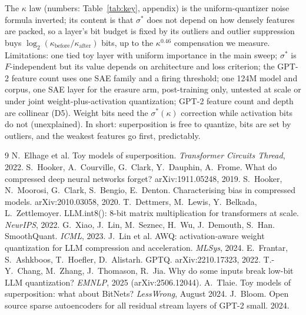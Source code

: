\documentclass{article}
\begin{document}
The $\kappa$ law (numbers: Table~\ref{tab:key}, appendix) is the uniform-quantizer noise formula inverted; its content is
that $\sigma^*$ does not depend on how densely features are packed, so a layer's bit budget is fixed by its outliers and outlier suppression buys
$\log_2(\kappa_{\mathrm{before}}/\kappa_{\mathrm{after}})$ bits, up to the $\kappa^{0.46}$ compensation we measure.
Limitations: one tied toy layer with uniform importance in the main sweep; $\sigma^*$ is $F$-independent but its value
depends on architecture and loss criterion; the GPT-2 feature count uses one SAE family and a firing threshold; one 124M model and corpus, one SAE layer for the erasure arm, post-training only, untested at scale or under joint weight-plus-activation
quantization; GPT-2 feature count and depth are collinear (D5). Weight bits need the $\sigma^*(\kappa)$ correction while activation bits do not (unexplained). In short: superposition is free to quantize, bits are set by outliers, and the weakest features
go first, predictably.

\clearpage
\begin{thebibliography}{9}\small
{} N.~Elhage et al. Toy models of superposition. \emph{Transformer Circuits Thread}, 2022.
 S.~Hooker, A.~Courville, G.~Clark, Y.~Dauphin, A.~Frome. What do compressed deep neural networks forget? arXiv:1911.05248, 2019.
 S.~Hooker, N.~Moorosi, G.~Clark, S.~Bengio, E.~Denton. Characterising bias in compressed models. arXiv:2010.03058, 2020.
 T.~Dettmers, M.~Lewis, Y.~Belkada, L.~Zettlemoyer. LLM.int8(): 8-bit matrix multiplication for transformers at scale. \emph{NeurIPS}, 2022.
 G.~Xiao, J.~Lin, M.~Seznec, H.~Wu, J.~Demouth, S.~Han. SmoothQuant. \emph{ICML}, 2023.
 J.~Lin et al. AWQ: activation-aware weight quantization for LLM compression and acceleration. \emph{MLSys}, 2024.
 E.~Frantar, S.~Ashkboos, T.~Hoefler, D.~Alistarh. GPTQ. arXiv:2210.17323, 2022.
 T.-Y.~Chang, M.~Zhang, J.~Thomason, R.~Jia. Why do some inputs break low-bit LLM quantization? \emph{EMNLP}, 2025 (arXiv:2506.12044).
 A.~Tlaie. Toy models of superposition: what about BitNets? \emph{LessWrong}, August 2024.
 J.~Bloom. Open source sparse autoencoders for all residual stream layers of GPT-2 small. 2024.
\end{thebibliography}
\end{document}
